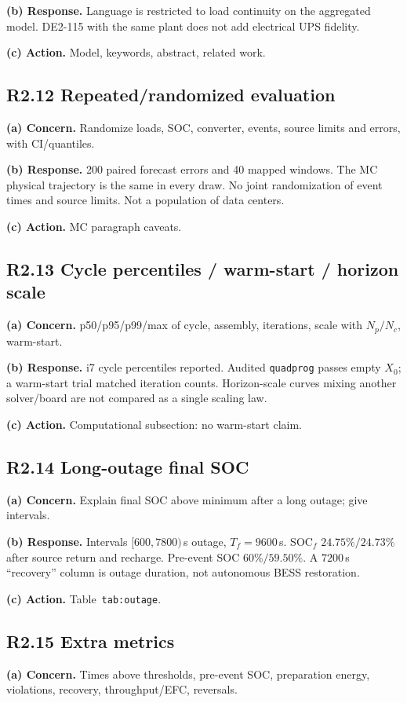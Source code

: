 \documentclass[11pt]{article}
\begin{document}
\textbf{(b) Response.} Language is restricted to load continuity on the aggregated model. DE2-115 with the same plant does not add electrical UPS fidelity.

\textbf{(c) Action.} Model, keywords, abstract, related work.

\subsection*{R2.12 Repeated/randomized evaluation}
\textbf{(a) Concern.} Randomize loads, SOC, converter, events, source limits and errors, with CI/quantiles.

\textbf{(b) Response.} 200 paired forecast errors and 40 mapped windows. The MC physical trajectory is the same in every draw. No joint randomization of event times and source limits. Not a population of data centers.

\textbf{(c) Action.} MC paragraph caveats.

\subsection*{R2.13 Cycle percentiles / warm-start / horizon scale}
\textbf{(a) Concern.} p50/p95/p99/max of cycle, assembly, iterations, scale with $N_p/N_c$, warm-start.

\textbf{(b) Response.} i7 cycle percentiles reported. Audited \texttt{quadprog} passes empty $X_0$; a warm-start trial matched iteration counts. Horizon-scale curves mixing another solver/board are not compared as a single scaling law.

\textbf{(c) Action.} Computational subsection: no warm-start claim.

\subsection*{R2.14 Long-outage final SOC}
\textbf{(a) Concern.} Explain final SOC above minimum after a long outage; give intervals.

\textbf{(b) Response.} Intervals $[600,7800)$\,s outage, $T_f=9600$\,s. SOC$_f$ $24.75\%/24.73\%$ after source return and recharge. Pre-event SOC $60\%/59.50\%$. A $7200$\,s ``recovery'' column is outage duration, not autonomous BESS restoration.

\textbf{(c) Action.} Table~\texttt{tab:outage}.

\subsection*{R2.15 Extra metrics}
\textbf{(a) Concern.} Times above thresholds, pre-event SOC, preparation energy, violations, recovery, throughput/EFC, reversals.
\end{document}
